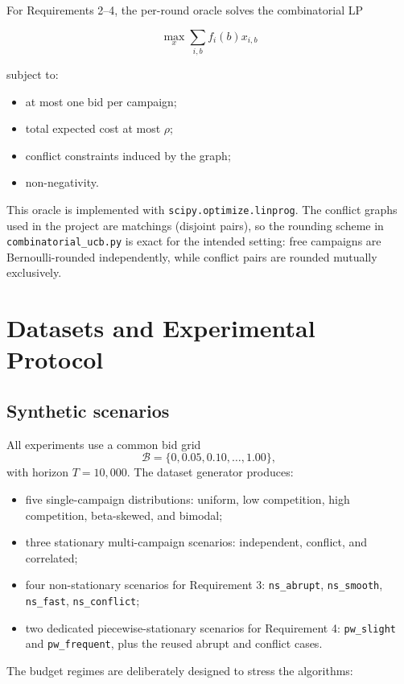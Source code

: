 \documentclass[11pt,a4paper]{article}
\newcommand{\T}{10{,}000}
\begin{document}
For Requirements 2--4, the per-round oracle solves the combinatorial LP

\[
\max_x \sum_{i,b} f_{i}(b)x_{i,b}
\]

subject to:

\begin{itemize}
  \item at most one bid per campaign;
  \item total expected cost at most $\rho$;
  \item conflict constraints induced by the graph;
  \item non-negativity.
\end{itemize}

This oracle is implemented with \texttt{scipy.optimize.linprog}. The conflict
graphs used in the project are matchings (disjoint pairs), so the rounding
scheme in \texttt{combinatorial\_ucb.py} is exact for the intended setting:
free campaigns are Bernoulli-rounded independently, while conflict pairs are
rounded mutually exclusively.

\section{Datasets and Experimental Protocol}

\subsection{Synthetic scenarios}

All experiments use a common bid grid
\[
\mathcal{B} = \{0, 0.05, 0.10, \dots, 1.00\},
\]
with horizon $T=\T$. The dataset generator produces:

\begin{itemize}
  \item five single-campaign distributions: uniform, low competition, high
  competition, beta-skewed, and bimodal;
  \item three stationary multi-campaign scenarios: independent, conflict, and
  correlated;
  \item four non-stationary scenarios for Requirement 3:
  \texttt{ns\_abrupt}, \texttt{ns\_smooth}, \texttt{ns\_fast},
  \texttt{ns\_conflict};
  \item two dedicated piecewise-stationary scenarios for Requirement 4:
  \texttt{pw\_slight} and \texttt{pw\_frequent}, plus the reused abrupt and
  conflict cases.
\end{itemize}

The budget regimes are deliberately designed to stress the algorithms:
\end{document}
